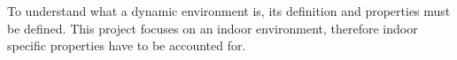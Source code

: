 To understand what a dynamic environment is, its definition and properties must be defined. This project focuses on an indoor environment, therefore indoor specific properties have to be accounted for.
